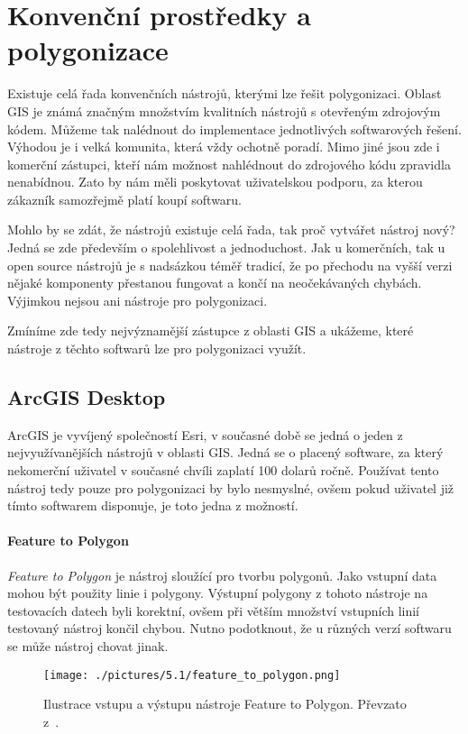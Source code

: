 \chapter{Konvenční prostředky a polygonizace}
\label{chap:konvencni prostredky a polygonizace}
	Existuje celá řada konvenčních nástrojů, kterými lze řešit polygonizaci. Oblast GIS je známá značným množstvím kvalitních nástrojů s otevřeným zdrojovým kódem. Můžeme tak nalédnout do implementace jednotlivých softwarových řešení. Výhodou je i velká komunita, která vždy ochotně poradí. Mimo jiné jsou zde i komerční zástupci, kteří nám možnost nahlédnout do zdrojového kódu zpravidla nenabídnou. Zato by nám měli poskytovat uživatelskou podporu, za kterou zákazník samozřejmě platí koupí softwaru.
	
	Mohlo by se zdát, že nástrojů existuje celá řada, tak proč vytvářet nástroj nový? Jedná se zde především o spolehlivost a jednoduchost. Jak u komerčních, tak u open source nástrojů je s nadsázkou téměř tradicí, že po přechodu na vyšší verzi nějaké komponenty přestanou fungovat a končí na neočekávaných chybách. Výjimkou nejsou ani nástroje pro polygonizaci.
	
	Zmíníme zde tedy nejvýznamější zástupce z oblasti GIS a ukážeme, které nástroje z těchto softwarů lze pro polygonizaci využít.
	
\section{ArcGIS Desktop}
	ArcGIS je vyvíjený společností Esri, v současné době se jedná o jeden z nejvyužívanějších nástrojů v oblasti GIS. Jedná se o placený software, za který nekomerční uživatel v současné chvíli zaplatí 100 dolarů ročně. Používat tento nástroj tedy pouze pro polygonizaci by bylo nesmyslné, ovšem pokud uživatel již tímto softwarem disponuje, je toto jedna z možností.
	
\subsubsection{Feature to Polygon}
	\textit{Feature to Polygon} je nástroj sloužící pro tvorbu polygonů. Jako vstupní data mohou být použity linie i polygony. Výstupní polygony z tohoto nástroje na testovacích datech byli korektní, ovšem při větším množství vstupních linií testovaný nástroj končil chybou. Nutno podotknout, že u různých verzí softwaru se může nástroj chovat jinak.

\begin{figure}[h]
  \centering
  \texttt{[image: ./pictures/5.1/feature\_to\_polygon.png]}
  \caption{Ilustrace vstupu a výstupu nástroje Feature to Polygon. Převzato z~\cite{arcgis}.}
  \label{fig:feature_to_polygon}
\end{figure}

